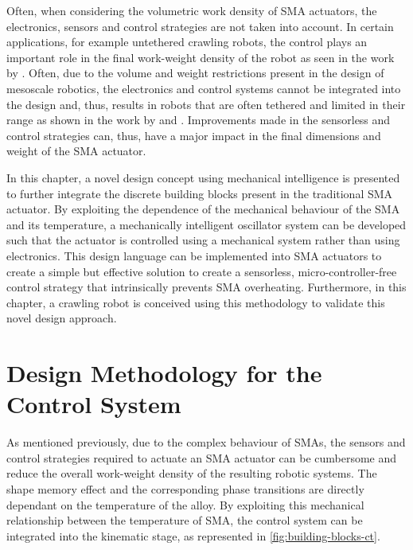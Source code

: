 Often, when considering the volumetric work density of SMA actuators, the electronics, sensors and control strategies are not taken into account. In certain applications, for example untethered crawling robots, the control plays an important role in the final work-weight density of the robot as seen in the work by \cite{yukShapeMemoryAlloybased2011}. Often, due to the volume and weight restrictions present in the design of mesoscale robotics, the electronics and control systems cannot be integrated into the design and, thus, results in robots that are often tethered and limited in their range as shown in the work by \cite{shiInchworminspiredCrawlingRobot2019a} and \cite{liangShapeMemoryAlloy2020}. Improvements made in the sensorless and control strategies can, thus, have a major impact in the final dimensions and weight of the SMA actuator.

In this chapter, a novel design concept using mechanical intelligence is presented to further integrate the discrete building blocks present in the traditional SMA actuator. By exploiting the dependence of the mechanical behaviour of the SMA and its temperature, a mechanically intelligent oscillator system can be developed such that the actuator is controlled using a mechanical system rather than using electronics. This design language can be implemented into SMA actuators to create a simple but effective solution to create a sensorless, micro-controller-free control strategy that intrinsically prevents SMA overheating. Furthermore, in this chapter, a crawling robot is conceived using this methodology to validate this novel design approach.

\section{Design Methodology for the Control System}
As mentioned previously, due to the complex behaviour of SMAs, the sensors and control strategies required to actuate an SMA actuator can be cumbersome and reduce the overall work-weight density of the resulting robotic systems. The shape memory effect and the corresponding phase transitions are directly dependant on the temperature of the alloy. By exploiting this mechanical relationship between the temperature of SMA, the control system can be integrated into the kinematic stage, as represented in \cref{fig:building-blocks-ct}.


